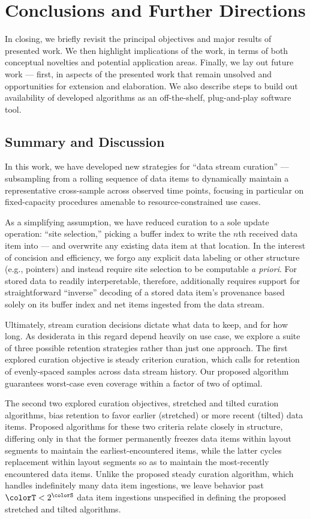 \section{Conclusions and Further Directions} \label{sec:conclusion}

In closing, we briefly revisit the principal objectives and major results of presented work.
We then highlight implications of the work, in terms of both conceptual novelties and potential application areas.
Finally, we lay out future work --- first, in aspects of the presented work that remain unsolved and opportunities for extension and elaboration.
We also describe steps to build out availability of developed algorithms as an off-the-shelf, plug-and-play software tool.

\subsection{Summary and Discussion}

In this work, we have developed new strategies for ``data stream curation'' --- subsampling from a rolling sequence of data items to dynamically maintain a representative cross-sample across observed time points, focusing in particular on fixed-capacity procedures amenable to resource-constrained use cases.

As a simplifying assumption, we have reduced curation to a sole update operation: ``site selection,'' picking a buffer index to write the $n$th received data item into --- and overwrite any existing data item at that location.
In the interest of concision and efficiency, we forgo any explicit data labeling or other structure (e.g., pointers) and instead require
site selection to be computable \textit{a priori}.
For stored data to readily interperetable, therefore, additionally requires support for straightforward ``inverse'' decoding of a stored data item's provenance based solely on its buffer index and net items ingested from the data stream.

Ultimately, stream curation decisions dictate what data to keep, and for how long.
As desiderata in this regard depend heavily on use case, we explore a suite of three possible retention strategies rather than just one approach.
The first explored curation objective is steady criterion curation, which calls for retention of evenly-spaced samples across data stream history.
Our proposed algorithm guarantees worst-case even coverage within a factor of two of optimal.

The second two explored curation objectives, stretched and tilted curation algorithms, bias retention to favor earlier (stretched) or more recent (tilted) data items.
Proposed algorithms for these two criteria relate closely in structure, differing only in that the former permanently freezes data items within layout segments to maintain the earliest-encountered items, while the latter cycles replacement within layout segments so as to maintain the most-recently encountered data items.
Unlike the proposed steady curation algorithm, which handles indefinitely many data item ingestions, we leave behavior past $\colorT < 2^{\colorS}$ data item ingestions unspecified in defining the proposed stretched and tilted algorithms.

